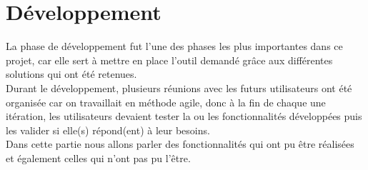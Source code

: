 \section{Développement}
La phase de développement fut l'une des phases les plus importantes dans ce projet, car elle sert à mettre en place l'outil demandé grâce aux différentes solutions qui ont été retenues.\\
Durant le développement, plusieurs réunions avec les futurs utilisateurs ont été organisée car on travaillait en méthode agile, donc à la fin de chaque une itération, les utilisateurs devaient tester la ou les fonctionnalités développées puis les valider si elle(s) répond(ent) à leur besoins.\\
Dans cette partie nous allons parler des fonctionnalités qui ont pu être réalisées et également celles qui n'ont pas pu l'être.

